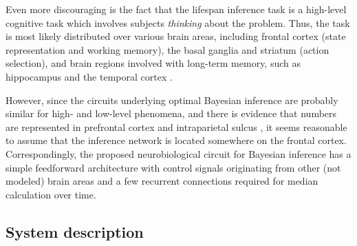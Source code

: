 \documentclass[a4paper,11pt]{article}
\begin{document}
Even more discouraging is the fact that the lifespan inference task is a high-level cognitive task which involves subjects \emph{thinking} about the problem. Thus, the task is most likely distributed over various brain areas, including frontal cortex (state representation and working memory), the basal ganglia and striatum (action selection), and brain regions involved with long-term memory, such as hippocampus and the temporal cortex \cite{kandel2012principles}.

However, since the circuits underlying optimal Bayesian inference are probably similar for high- and low-level phenomena, and there is evidence that numbers are represented in prefrontal cortex and intraparietal sulcus \cite{nieder2009representation}, it seems reasonable to assume that the inference network is located somewhere on the frontal cortex. Correspondingly, the proposed neurobiological circuit for Bayesian inference has a simple feedforward architecture with control signals originating from other (not modeled) brain areas and a few recurrent connections required for median calculation over time.

\subsection{System description}
\end{document}

